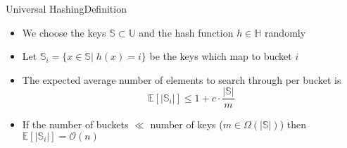 
\begin{frame}{Universal Hashing}{Definition}
  \begin{itemize}
    \item
      We choose the keys $\mathbb{S} \subset \mathbb{U}$ and the
      hash function $h \in \mathbb{H}$ randomly
    \item
      Let $\mathbb{S}_i = \{x \in \mathbb{S} | \; h(x) = i\}$ be the 
      keys which
      map to bucket $i$
    \item
      The expected average number of elements to search through per 
      bucket is
      \[\mathbb{E}\left[\vert \mathbb{S}_i \vert\right]
        \leq 1 + c \cdot \frac{\vert \mathbb{S} \vert}{m}\]
    \item
      If the number of buckets $\ll$ number of keys
      ($m \in \Omega(\vert \mathbb{S} \vert)$) then
      $\mathbb{E}\left[\vert \mathbb{S}_i \vert\right] = \mathcal{O}(n)$
  \end{itemize}
\end{frame}